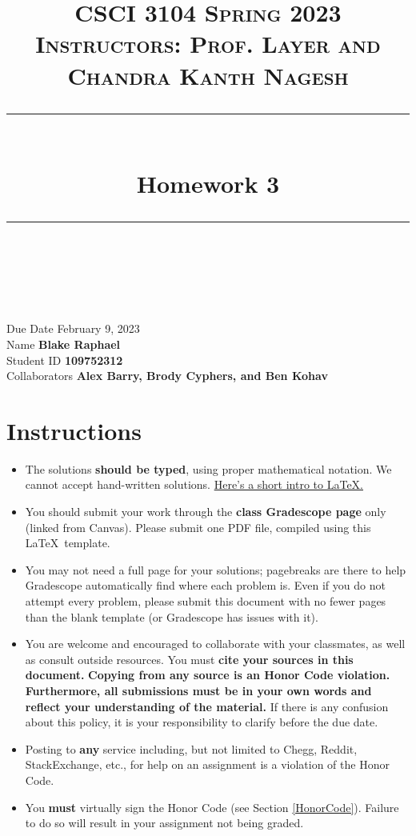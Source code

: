 \documentclass[11pt]{article}
\title{
\normalfont \normalsize 
\textsc{CSCI 3104 Spring 2023 \\ 
Instructors: Prof. Layer and Chandra Kanth Nagesh} \\
[10pt] 
\rule{\linewidth}{0.5pt} \\[6pt] 
\huge Homework 3 \\
\rule{\linewidth}{2pt}  \\[10pt]
}
\date{}
\theoremstyle{definition}
\theoremstyle{definition}
\theoremstyle{definition}
\begin{document}

\maketitle


\noindent
Due Date \dotfill February 9, 2023 \\
Name \dotfill \textbf{Blake Raphael} \\
Student ID \dotfill \textbf{109752312} \\
Collaborators \dotfill \textbf{Alex Barry, Brody Cyphers, and Ben Kohav}

\tableofcontents

\section{Instructions}
 \begin{itemize}
	\item The solutions \textbf{should be typed}, using proper mathematical notation. We cannot accept hand-written solutions. \href{http://ece.uprm.edu/~caceros/latex/introduction.pdf}{Here's a short intro to \LaTeX.}
	\item You should submit your work through the \textbf{class Gradescope page} only (linked from Canvas). Please submit one PDF file, compiled using this \LaTeX \ template.
	\item You may not need a full page for your solutions; pagebreaks are there to help Gradescope automatically find where each problem is. Even if you do not attempt every problem, please submit this document with no fewer pages than the blank template (or Gradescope has issues with it).

	\item You are welcome and encouraged to collaborate with your classmates, as well as consult outside resources. You must \textbf{cite your sources in this document.} \textbf{Copying from any source is an Honor Code violation. Furthermore, all submissions must be in your own words and reflect your understanding of the material.} If there is any confusion about this policy, it is your responsibility to clarify before the due date. 

	\item Posting to \textbf{any} service including, but not limited to Chegg, Reddit, StackExchange, etc., for help on an assignment is a violation of the Honor Code.

	\item You \textbf{must} virtually sign the Honor Code (see Section \ref{HonorCode}). Failure to do so will result in your assignment not being graded.
\end{itemize}
\end{document}
